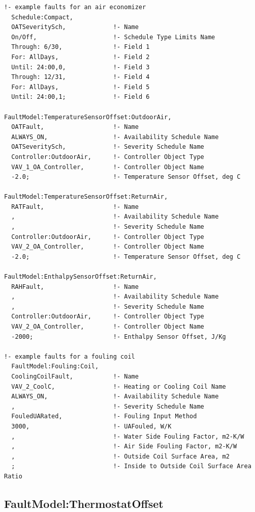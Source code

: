 \begin{lstlisting}
!- example faults for an air economizer
  Schedule:Compact,
  OATSeveritySch,             !- Name
  On/Off,                     !- Schedule Type Limits Name
  Through: 6/30,              !- Field 1
  For: AllDays,               !- Field 2
  Until: 24:00,0,             !- Field 3
  Through: 12/31,             !- Field 4
  For: AllDays,               !- Field 5
  Until: 24:00,1;             !- Field 6

FaultModel:TemperatureSensorOffset:OutdoorAir,
  OATFault,                   !- Name
  ALWAYS_ON,                  !- Availability Schedule Name
  OATSeveritySch,             !- Severity Schedule Name
  Controller:OutdoorAir,      !- Controller Object Type
  VAV_1_OA_Controller,        !- Controller Object Name
  -2.0;                       !- Temperature Sensor Offset, deg C

FaultModel:TemperatureSensorOffset:ReturnAir,
  RATFault,                   !- Name
  ,                           !- Availability Schedule Name
  ,                           !- Severity Schedule Name
  Controller:OutdoorAir,      !- Controller Object Type
  VAV_2_OA_Controller,        !- Controller Object Name
  -2.0;                       !- Temperature Sensor Offset, deg C

FaultModel:EnthalpySensorOffset:ReturnAir,
  RAHFault,                   !- Name
  ,                           !- Availability Schedule Name
  ,                           !- Severity Schedule Name
  Controller:OutdoorAir,      !- Controller Object Type
  VAV_2_OA_Controller,        !- Controller Object Name
  -2000;                      !- Enthalpy Sensor Offset, J/Kg

!- example faults for a fouling coil
  FaultModel:Fouling:Coil,
  CoolingCoilFault,           !- Name
  VAV_2_CoolC,                !- Heating or Cooling Coil Name
  ALWAYS_ON,                  !- Availability Schedule Name
  ,                           !- Severity Schedule Name
  FouledUARated,              !- Fouling Input Method
  3000,                       !- UAFouled, W/K
  ,                           !- Water Side Fouling Factor, m2-K/W
  ,                           !- Air Side Fouling Factor, m2-K/W
  ,                           !- Outside Coil Surface Area, m2
  ;                           !- Inside to Outside Coil Surface Area Ratio
\end{lstlisting}

\subsection{FaultModel:ThermostatOffset}\label{faultmodelthermostatoffset}

